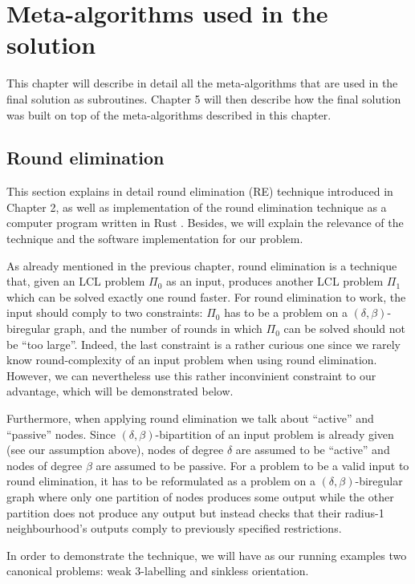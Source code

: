 \chapter{Meta-algorithms used in the solution}
\label{chapter:environment}

This chapter will describe in detail all the meta-algorithms that are
used in the final solution as subroutines.
Chapter 5 will then
describe how the final solution was built on top of the meta-algorithms
described in this chapter.

\section{Round elimination}

This section explains in detail round elimination (RE)
technique introduced in Chapter 2, as well as
implementation of the round elimination technique as a computer
program written in Rust \cite{Brandt2019, Olivetti2020}.
Besides, we will explain the relevance of the technique
and the software implementation for our problem.

As already mentioned in the previous chapter, round elimination
is a technique that, given an LCL problem $\Pi_0$ as an input, produces
another LCL problem $\Pi_1$ which can be solved exactly one round
faster. For round elimination to work, the input should comply
to two constraints: $\Pi_0$ has to be a problem on a $(\delta, \beta)$-biregular
graph, and the number of rounds in which $\Pi_0$ can be solved
should not be ``too large''. Indeed, the last constraint is a rather curious one
since we rarely know round-complexity of an input problem when using
round elimination. However, we can nevertheless use this rather inconvinient constraint
to our advantage, which will be demonstrated below.

Furthermore, when applying round elimination we talk about ``active'' and
``passive'' nodes. Since $(\delta, \beta)$-bipartition of an input problem is
already given (see our assumption above), nodes of degree $\delta$ are assumed
to be ``active'' and nodes of degree $\beta$ are assumed to be passive. For a problem
to be a valid input to round elimination, it has to be reformulated as a problem on
a $(\delta, \beta)$-biregular graph where only one partition of nodes produces
some output while the other partition does not produce any output but instead
checks that their radius-1 neighbourhood's outputs comply to previously
specified restrictions.

In order to demonstrate the technique, we will have as our running
examples two canonical problems: weak 3-labelling and sinkless orientation.

